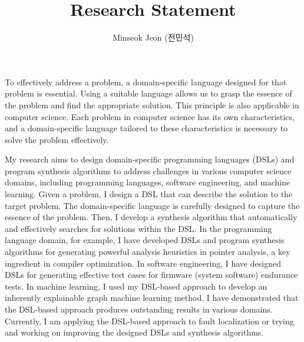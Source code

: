 \documentclass[11pt]{article}
\begin{document}
\title{Research Statement}

\author{Minseok Jeon (전민석)}



\newcommand{\DisjunctiveModel}{\textsc{Disjunctive Model}}
\newcommand{\FeatureLanguage}{\textsc{Feature Language}}
\newcommand{\GDL}{\textsc{Graph Description Language}}
\newcommand{\PLXGL}{\textsc{PL4XGL}}


\newcommand{\AbstractRelativeWritePattern}{\textsc{Abstract Relative Write Pattern}}

\maketitle 


To effectively address a problem, a domain-specific language designed for that problem is essential. 
%
Using a suitable language allows us to grasp the essence of the problem and find the appropriate solution. 
%
This principle is also applicable in computer science.
%
Each problem in computer science has its own characteristics, and a domain-specific language tailored to these characteristics is necessary to solve the problem effectively.




My research aims to design domain-specific programming languages (DSLs) and program synthesis algorithms to address challenges in various computer science domains, including programming languages, software engineering, and machine learning.
%
Given a problem, I design a DSL that can describe the solution to the target problem.
%
The domain-specific language is carefully designed to capture the essence of the problem.
%
Then, I develop a synthesis algorithm that automatically and effectively searches for solutions within the DSL.
%
In the programming language domain, for example, I have developed DSLs and program synthesis algorithms for generating powerful analysis heuristics in pointer analysis, a key ingredient in compiler optimization.
%
In software engineering, I have designed DSLs for generating effective test cases for firmware (system software) endurance tests. 
%
In machine learning, I used my DSL-based approach to develop an inherently explainable graph machine learning method.
%
I have demonstrated that the DSL-based approach produces outstanding results in various domains.
%
Currently, I am applying the DSL-based approach to fault localization or trying and working on improving the designed DSLs and synthesis algorithms.
\end{document}

